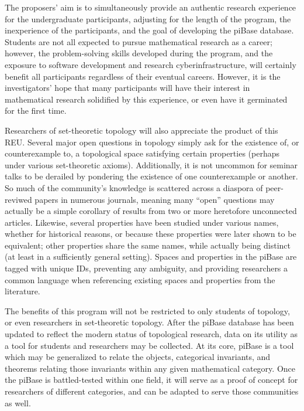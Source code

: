   The proposers' aim is to simultaneously provide an authentic research
  experience for the undergraduate participants, adjusting for the length of
  the program, the inexperience of the participants, and the goal of
  developing the piBase database. Students are not all expected to pursue
  mathematical research as a career; however, the problem-solving skills
  developed during the program, and the exposure to software
  development and research cyberinfrastructure, will certainly benefit all
  participants regardless of their eventual careers. However, it is
  the investigators' hope that many participants will have their interest
  in mathematical research solidified by this experience, or even have it
  germinated for the first time.

  Researchers of set-theoretic topology will also appreciate the product
  of this REU. Several major open questions in topology simply ask for
  the existence of, or counterexample to, a topological space satisfying
  certain properties (perhaps under various set-theoretic axioms).
  Additionally, it is not uncommon for seminar talks to be derailed by
  pondering the existence of one counterexample or another. So much
  of the community's knowledge is scattered across
  a diaspora of peer-reviwed papers in numerous journals, meaning many
  ``open'' questions may actually be a simple corollary of results from
  two or more heretofore unconnected articles. Likewise, several properties
  have been
  studied under various names, whether for historical reasons, or because
  these properties were later shown to be equivalent; other properties share
  the same names, while actually being distinct (at least in a sufficiently
  general setting). Spaces and properties in the piBase are tagged with
  unique IDs, preventing any ambiguity, and providing researchers a common
  language when referencing existing spaces and properties from the literature.

  The benefits of this program will not be restricted to only students of
  topology, or even researchers in set-theoretic topology. After the
  piBase database has been updated to reflect the modern status of topological
  research, data on its utility as a tool for students and researchers may
  be collected. At its core, piBase is a tool which may be generalized
  to relate the objects, categorical invariants, and theorems relating those
  invariants within any given mathematical category. Once the piBase is
  battled-tested within one field, it will serve as a proof of concept for
  researchers of different categories, and can be adapted to serve those
  communities as well.

